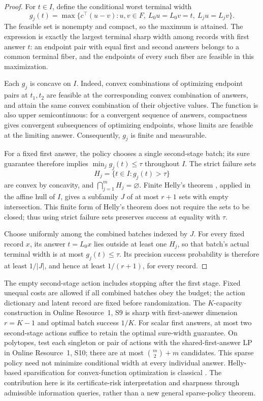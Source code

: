 \begin{proof}
For $t\in I$, define the conditional worst terminal width
\[
 g_j(t)=\max\{c^\top(u-v):u,v\in F,\ L_0u=L_0v=t,
                                      \ L_ju=L_jv\}.
\]
The feasible set is nonempty and compact, so the maximum is attained.
The expression is exactly the largest terminal sharp width among records
with first answer $t$: an endpoint pair with equal first and second
answers belongs to a common terminal fiber, and the endpoints of every
such fiber are feasible in this maximization.

Each $g_j$ is concave on $I$. Indeed, convex combinations of optimizing
endpoint pairs at $t_1,t_2$ are feasible at the corresponding convex
combination of answers, and attain the same convex combination of their
objective values. The function is also upper semicontinuous: for a
convergent sequence of answers, compactness gives convergent subsequences
of optimizing endpoints, whose limits are feasible at the limiting
answer. Consequently, $g_j$ is finite and measurable.

For a fixed first answer, the policy chooses a single second-stage batch;
its sure guarantee therefore implies $\min_jg_j(t)\leq\tau$ throughout
$I$. The strict failure sets
\[
 H_j=\{t\in I:g_j(t)>\tau\}
\]
are convex by concavity, and $\bigcap_{j=1}^m H_j=\varnothing$.
Finite Helly's theorem \citep[Theorem~1.1]{amenta2016}, applied in the affine hull of $I$, gives a
subfamily $J$ of at most $r+1$ sets with empty intersection. This finite
form of Helly's theorem does not require the sets to be closed; thus
using strict failure sets preserves success at equality with $\tau$.

Choose uniformly among the combined batches indexed by $J$. For every
fixed record $x$, its answer $t=L_0x$ lies outside at least one $H_j$,
so that batch's actual terminal width is at most $g_j(t)\leq\tau$.
Its precision success probability is therefore at least $1/|J|$, and
hence at least $1/(r+1)$, for every record.
\end{proof}


The empty second-stage action includes stopping after the first stage.
Fixed unequal costs are allowed if all combined batches obey the budget;
the action dictionary and latent record are fixed before randomization.
The $K$-capacity construction in Online Resource~1, S9 is sharp
with first-answer dimension $r=K-1$ and optimal batch success $1/K$.
For scalar first answers, at most two second-stage actions suffice to
retain the optimal sure-width guarantee. On polytopes, test each singleton
or pair of actions with the shared-first-answer LP in
Online Resource~1, S10; there are at most
$\binom m2+m$ candidates. This sparse policy need not minimize conditional
width at every individual answer. Helly-based sparsification for
convex-function optimization is classical
\citep[Section~2, Theorem~1]{rockafellar1965}. The contribution here is
its certificate-risk interpretation and sharpness through admissible
information queries, rather than a new general sparse-policy theorem.
